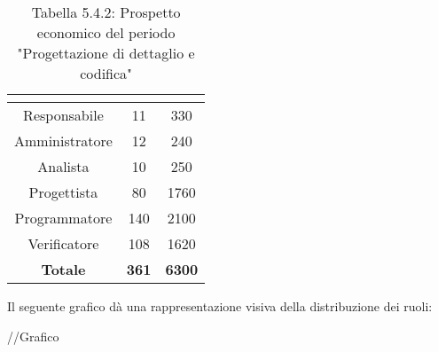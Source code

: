 \renewcommand{\arraystretch}{1.5}
\begin{table}[H]
\begin{center}
\begin{tabular}{|c|c|c|}
\hline
\rowcolor{title_row}
\textbf{\color{title_text}{Ruolo}}  & \textbf{\color{title_text}{Ore}} & \textbf{\color{title_text}{Costo in \euro}} \\ \hline
Responsabile    & 11           & 330                 \\ \hline
Amministratore  & 12           & 240                 \\ \hline
Analista        & 10           & 250                 \\ \hline
Progettista     & 80           & 1760                \\ \hline
Programmatore   & 140          & 2100                \\ \hline
Verificatore    & 108          & 1620                \\ \hline
\textbf{Totale} & \textbf{361}    & \textbf{6300}           \\ \hline
\end{tabular}
\caption{Tabella 5.4.2: Prospetto economico del periodo "Progettazione di dettaglio e codifica"\label{}}
\end{center}
\end{table}
\renewcommand{\arraystretch}{1}

Il seguente grafico dà una rappresentazione visiva della distribuzione dei ruoli: \\
\begin{center}
//Grafico
\end{center}

\pagebreak